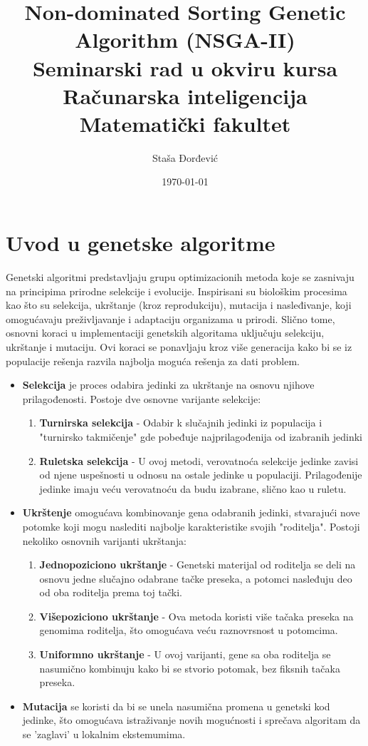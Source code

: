 \documentclass[12pt]{article}
\title{Non-dominated Sorting Genetic Algorithm (NSGA-II) \\
\normalsize Seminarski rad u okviru kursa\\ Računarska inteligencija
\\Matematički fakultet}
\author{Staša Đorđević}
\date{\today}
\begin{document}
\maketitle

\tableofcontents

\section{Uvod u genetske algoritme}
Genetski algoritmi predstavljaju grupu optimizacionih metoda koje se zasnivaju na principima prirodne selekcije i evolucije. Inspirisani su biološkim procesima kao što su selekcija, ukrštanje (kroz reprodukciju), mutacija i nasleđivanje, koji omogućavaju preživljavanje i adaptaciju organizama u prirodi. Slično tome, osnovni koraci u implementaciji genetskih algoritama uključuju selekciju, ukrštanje i mutaciju. Ovi koraci se ponavljaju kroz više generacija kako bi se iz populacije rešenja razvila najbolja moguća rešenja za dati problem.

\begin{itemize}
    \item \textbf{Selekcija} je proces odabira jedinki za ukrštanje na osnovu njihove prilagođenosti. Postoje dve osnovne varijante selekcije:
    \begin{enumerate}
        \item \textbf{Turnirska selekcija} - Odabir k slučajnih jedinki iz populacija i "turnirsko takmičenje" gde pobeđuje najprilagođenija od izabranih jedinki
        \item \textbf{Ruletska selekcija} - U ovoj metodi, verovatnoća selekcije jedinke zavisi od njene uspešnosti u odnosu na ostale jedinke u populaciji. Prilagođenije jedinke imaju veću verovatnoću da budu izabrane, slično kao u ruletu.
    \end{enumerate}
    \item \textbf{Ukrštenje} omogućava kombinovanje gena odabranih jedinki, stvarajući nove potomke koji mogu naslediti najbolje karakteristike svojih "roditelja". Postoji nekoliko osnovnih varijanti ukrštanja:
    \begin{enumerate}
        \item \textbf{Jednopoziciono ukrštanje} - Genetski materijal od roditelja se deli na osnovu jedne slučajno odabrane tačke preseka, a potomci nasleđuju deo od oba roditelja prema toj tački.
        \item \textbf{Višepoziciono ukrštanje} - Ova metoda koristi više tačaka preseka na genomima roditelja, što omogućava veću raznovrsnost u potomcima.
        \item \textbf{Uniformno ukrštanje} - U ovoj varijanti, gene sa oba roditelja se nasumično kombinuju kako bi se stvorio potomak, bez fiksnih tačaka preseka.
    \end{enumerate}
    \item \textbf{Mutacija} se koristi da bi se unela nasumična promena u genetski kod jedinke, što omogućava istraživanje novih mogućnosti i sprečava algoritam da se 'zaglavi' u lokalnim ekstemumima.
\end{itemize}
\end{document}
